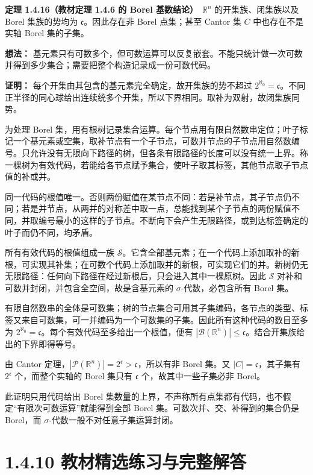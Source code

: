 \documentclass[11pt,a4paper]{article}
\begin{document}
\textbf{定理 1.4.16（教材定理 1.4.6 的 Borel
基数结论）}　\(\mathbb R^n\) 的开集族、闭集族以及 Borel 集族的势均为
\(\mathfrak c\)。因此存在非 Borel 点集；甚至 Cantor 集 \(C\)
中也存在不是实轴 Borel 集的子集。

\textbf{想法：}
基元素只有可数多个，但可数运算可以反复嵌套。不能只统计做一次可数并得到多少集合；需要把整个构造记录成一份可数代码。

\textbf{证明：} 每个开集由其包含的基元素完全确定，故开集族的势不超过
\(2^{\aleph_0}=\mathfrak c\)。不同正半径的同心球给出连续统多个开集，所以下界相同。取补为双射，故闭集族同势。

为处理 Borel
集，用有根树记录集合运算。每个节点用有限自然数串定位；叶子标记一个基元素或空集，取补节点有一个子节点，可数并节点的子节点用自然数编号。只允许没有无限向下路径的树，但各条有限路径的长度可以没有统一上界。称一棵树为有效代码，若能给各节点赋予集合，使叶子取其标签，其他节点取子节点值的补或并。

同一代码的根值唯一。否则两份赋值在某节点不同：若是补节点，其子节点仍不同；若是并节点，从两并的对称差中取一点，总能找到某个子节点的两份赋值不同，并取编号最小的这样的子节点。不断向下会产生无限路径，或到达标签确定的叶子而仍不同，均矛盾。

所有有效代码的根值组成一族
\(\mathcal S\)。它含全部基元素；在一个代码上添加取补的新根，可实现其补集；在可数个代码上添加取并的新根，可实现它们的并。新树仍无无限路径：任何向下路径在经过新根后，只会进入其中一棵原树。因此
\(\mathcal S\) 对补和可数并封闭，并包含全空间，故是含基元素的
\(\sigma\)-代数，必包含所有 Borel 集。

有限自然数串的全体是可数集；树的节点集合可用其子集编码，各节点的类型、标签又来自可数集，可一并编码为一个可数集的子集。因此所有这种代码的数目至多为
\(2^{\aleph_0}=\mathfrak c\)。每个有效代码至多给出一个根值，便有
\(|\mathcal B(\mathbb R^n)|\leq\mathfrak c\)。结合开集族给出的下界即得等号。

由 Cantor
定理，\(|\mathcal P(\mathbb R^n)|=2^{\mathfrak c}>\mathfrak c\)，所以有非
Borel 集。又 \(|C|=\mathfrak c\)，其子集有 \(2^{\mathfrak c}\)
个，而整个实轴的 Borel 集只有 \(\mathfrak c\) 个，故其中一些子集必非
Borel。

此证明只用代码给出 Borel
集数量的上界，不声称所有点集都有代码，也不假定``有限次可数运算''就能得到全部
Borel 集。可数次并、交、补得到的集合仍是 Borel，而
\(\sigma\)-代数一般不对任意子集运算封闭。

\section[\S{}1.4.10
教材精选练习与完整解答]{1.4.10
教材精选练习与完整解答}\label{ux6559ux6750ux7cbeux9009ux7ec3ux4e60ux4e0eux5b8cux6574ux89e3ux7b54}
\end{document}

